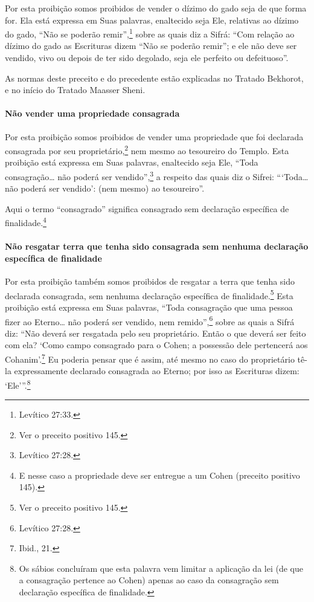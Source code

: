 Por esta proibição somos proibidos de vender o dízimo do gado seja de
que forma for. Ela está expressa em Suas palavras, enaltecido seja Ele,
relativas ao dízimo do gado, ``Não se poderão remir'',\footnote{Levítico 27:33.}
sobre as quais diz a Sifrá: ``Com relação ao dízimo do gado as
Escrituras dizem ``Não se poderão remir''; e ele não deve ser vendido,
vivo ou depois de ter sido degolado, seja ele perfeito ou defeituoso''.

As normas deste preceito e do precedente estão explicadas no Tratado
Bekhorot, e no início do Tratado Maasser Sheni.

\paragraph{Não vender uma propriedade consagrada}

Por esta proibição somos proibidos de vender uma propriedade que foi
declarada consagrada por seu proprietário,\footnote{Ver o preceito positivo 145.} nem
mesmo ao tesoureiro do Templo. Esta proibição está expressa em Suas
palavras, enaltecido seja Ele,
``Toda consagração\ldots{} não poderá ser vendido'',\footnote{Levítico 27:28.} a
respeito das quais diz o Sifrei: ```Toda\ldots{} não poderá ser vendido':
(nem mesmo) ao tesoureiro''.

Aqui o termo ``consagrado'' significa consagrado sem declaração
específica de finalidade.\footnote{E nesse caso a propriedade deve ser entregue a um Cohen (preceito positivo 145).}

\paragraph{Não resgatar terra que tenha sido consagrada sem nenhuma declaração
específica de finalidade}

Por esta proibição também somos proibidos de resgatar a terra que tenha
sido declarada consagrada, sem nenhuma declaração específica de
finalidade.\footnote{Ver o preceito positivo 145.} Esta proibição está expressa em Suas
palavras, ``Toda consagração que uma pessoa fizer ao Eterno\ldots{} não
poderá ser vendido, nem remido'',\footnote{Levítico 27:28.} sobre as quais a
Sifrá diz: ``Não deverá ser resgatada pelo seu proprietário. Então o que
deverá ser feito com ela? `Como campo consagrado para o Cohen; a
possessão dele pertencerá aos Cohanim'.\footnote{Ibid., 21.} Eu poderia pensar
que é assim, até mesmo no caso do proprietário tê-la expressamente
declarado consagrada ao Eterno; por isso as Escrituras dizem:
`Ele'''.\footnote{Os sábios concluíram que esta palavra vem limitar a aplicação da
lei (de que a consagração pertence ao Cohen) apenas ao caso da
consagração sem declaração específica de finalidade.}

